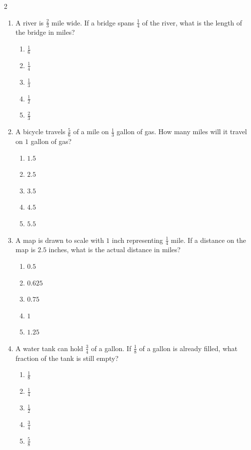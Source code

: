 \documentclass[10pt]{article}
\begin{document}
\begin{multicols}{2}
\begin{enumerate}[label=\textbf{Q\arabic*.}, leftmargin=*, itemsep=6pt, parsep=0pt]
  \item \small A river is $\frac{2}{3}$ mile wide. If a bridge spans $\frac{1}{4}$ of the river, what is the length of the bridge in miles?
  \begin{enumerate}[label=(\Alph*), leftmargin=0.6cm, nosep, itemsep=2pt]
    \item $\frac{1}{6}$
    \item $\frac{1}{4}$
    \item $\frac{1}{3}$
    \item $\frac{1}{2}$
    \item $\frac{2}{3}$
  \end{enumerate}

  \item \small A bicycle travels $\frac{5}{6}$ of a mile on $\frac{1}{3}$ gallon of gas. How many miles will it travel on $1$ gallon of gas?
  \begin{enumerate}[label=(\Alph*), leftmargin=0.6cm, nosep, itemsep=2pt]
    \item $1.5$
    \item $2.5$
    \item $3.5$
    \item $4.5$
    \item $5.5$
  \end{enumerate}

  \item \small A map is drawn to scale with $1$ inch representing $\frac{1}{4}$ mile. If a distance on the map is $2.5$ inches, what is the actual distance in miles?
  \begin{enumerate}[label=(\Alph*), leftmargin=0.6cm, nosep, itemsep=2pt]
    \item $0.5$
    \item $0.625$
    \item $0.75$
    \item $1$
    \item $1.25$
  \end{enumerate}

  \item \small A water tank can hold $\frac{3}{4}$ of a gallon. If $\frac{1}{8}$ of a gallon is already filled, what fraction of the tank is still empty?
  \begin{enumerate}[label=(\Alph*), leftmargin=0.6cm, nosep, itemsep=2pt]
    \item $\frac{1}{8}$
    \item $\frac{1}{4}$
    \item $\frac{1}{2}$
    \item $\frac{3}{4}$
    \item $\frac{5}{8}$
  \end{enumerate}


\end{enumerate}
\end{multicols}
\end{document}
